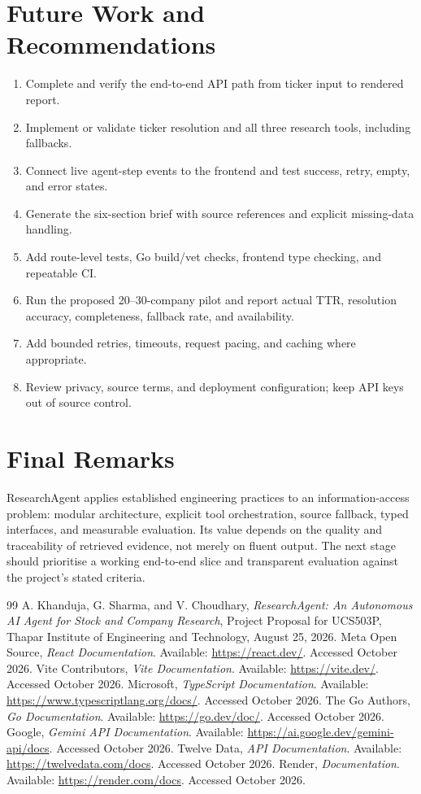 \documentclass[12pt,a4paper,oneside]{report}
\begin{document}
\section{Future Work and Recommendations}
\begin{enumerate}[leftmargin=*]
\item Complete and verify the end-to-end API path from ticker input to rendered report.
\item Implement or validate ticker resolution and all three research tools, including fallbacks.
\item Connect live agent-step events to the frontend and test success, retry, empty, and error states.
\item Generate the six-section brief with source references and explicit missing-data handling.
\item Add route-level tests, Go build/vet checks, frontend type checking, and repeatable CI.
\item Run the proposed 20--30-company pilot and report actual TTR, resolution accuracy, completeness, fallback rate, and availability.
\item Add bounded retries, timeouts, request pacing, and caching where appropriate.
\item Review privacy, source terms, and deployment configuration; keep API keys out of source control.
\end{enumerate}

\section{Final Remarks}
ResearchAgent applies established engineering practices to an information-access problem: modular architecture, explicit tool orchestration, source fallback, typed interfaces, and measurable evaluation. Its value depends on the quality and traceability of retrieved evidence, not merely on fluent output. The next stage should prioritise a working end-to-end slice and transparent evaluation against the project's stated criteria.

\begin{thebibliography}{99}
 A. Khanduja, G. Sharma, and V. Choudhary, \textit{ResearchAgent: An Autonomous AI Agent for Stock and Company Research}, Project Proposal for UCS503P, Thapar Institute of Engineering and Technology, August 25, 2026.
 Meta Open Source, \textit{React Documentation}. Available: \url{https://react.dev/}. Accessed October 2026.
 Vite Contributors, \textit{Vite Documentation}. Available: \url{https://vite.dev/}. Accessed October 2026.
 Microsoft, \textit{TypeScript Documentation}. Available: \url{https://www.typescriptlang.org/docs/}. Accessed October 2026.
 The Go Authors, \textit{Go Documentation}. Available: \url{https://go.dev/doc/}. Accessed October 2026.
 Google, \textit{Gemini API Documentation}. Available: \url{https://ai.google.dev/gemini-api/docs}. Accessed October 2026.
 Twelve Data, \textit{API Documentation}. Available: \url{https://twelvedata.com/docs}. Accessed October 2026.
 Render, \textit{Documentation}. Available: \url{https://render.com/docs}. Accessed October 2026.
\end{thebibliography}
\end{document}
